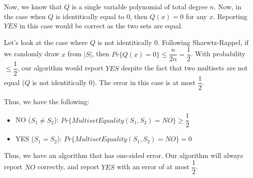 \documentclass{article}
\begin{document}
Now, we know that $Q$ is a single variable polynomial of total degree $n$. Now, in the case when $Q$ is identitically
equal to 0, then $Q(x) = 0$ for any $x$. Reporting $YES$ in this case would be correct as the two sets are equal.

Let's look at the case where $Q$ is not identitically 0. Following Sharwtz-Rappel, if we randomly draw $x$ from $|S|$,
then $Pr\{Q(x) = 0\} \leq \dfrac{n}{2n} = \dfrac{1}{2}$. With probability $\leq \dfrac{1}{2}$, our algorithm would
report $YES$ despite the fact that two multisets are not equal ($Q$ is not identitically 0). The error in this case is
at most $\dfrac{1}{2}$.

Thus, we have the following:
\begin{itemize}
    \item NO ($S_1 \neq S_2$): $Pr\{MultisetEquality(S_1, S_2) = NO\} \geq \dfrac{1}{2}$
    \item YES ($S_1 = S_2$): $Pr\{MultisetEquality(S_1, S_2) = NO\} = 0$
\end{itemize}

Thus, we have an algorithm that has one-sided error. Our algorithm will always report $NO$ correctly, and report $YES$
with an error of at most $\dfrac{1}{2}$.
\end{document}

